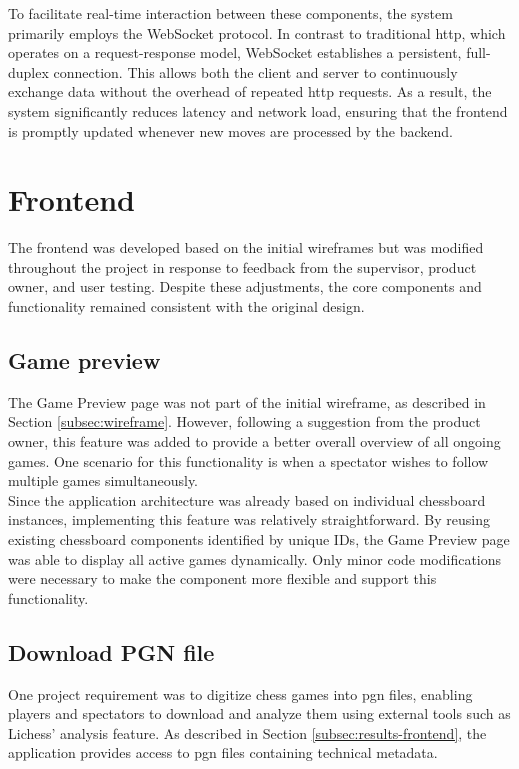 To facilitate real-time interaction between these components, the system primarily employs the WebSocket protocol. In contrast to traditional \gls{http}, which operates on a request-response model, WebSocket establishes a persistent, full-duplex connection. This allows both the client and server to continuously exchange data without the overhead of repeated \gls{http} requests. As a result, the system significantly reduces latency and network load, ensuring that the frontend is promptly updated whenever new moves are processed by the backend.

\section{Frontend}
The frontend was developed based on the initial wireframes but was modified throughout the project in response to feedback from the supervisor, product owner, and user testing. Despite these adjustments, the core components and functionality remained consistent with the original design.

\subsection{Game preview}
The Game Preview page was not part of the initial wireframe, as described in Section \ref{subsec:wireframe}. However, following a suggestion from the product owner, this feature was added to provide a better overall overview of all ongoing games. One scenario for this functionality is when a spectator wishes to follow multiple games simultaneously. \\

Since the application architecture was already based on individual chessboard instances, implementing this feature was relatively straightforward. By reusing existing chessboard components identified by unique IDs, the Game Preview page was able to display all active games dynamically. Only minor code modifications were necessary to make the component more flexible and support this functionality.

\subsection{Download PGN file}
One project requirement was to digitize chess games into \gls{pgn} files, enabling players and spectators to download and analyze them using external tools such as Lichess’ analysis feature. As described in Section \ref{subsec:results-frontend}, the application provides access to \gls{pgn} files containing technical metadata. \\

